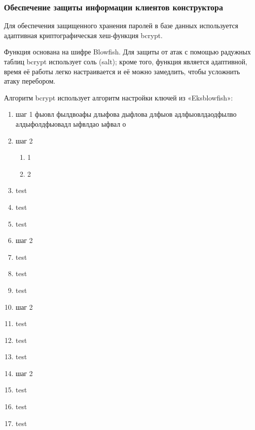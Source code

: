 
\subsubsection{Обеспечение защиты информации клиентов конструктора}

Для обеспечения защищенного хранения паролей в базе данных используется
адаптивная криптографическая хеш-функция bcrypt.

Функция основана на шифре Blowfish.
Для защиты от атак с помощью радужных таблиц bcrypt использует соль (salt);
кроме того, функция является адаптивной,
время её работы легко настраивается и её можно замедлить, чтобы усложнить атаку перебором.


Алгоритм bcrypt использует алгоритм настройки ключей из «Eksblowfish»:

\begin{enumerate}
	\item шаг 1 фыовл фылдвоафы длыфова дыфлова длфыов адлфыовлдаодфылво алдыфолдфыовадл ыфвлдао ыфвал о
	\item шаг 2
	      \begin{enumerate}
		      \item 1
		      \item 2
	      \end{enumerate}
	\item test
	\item test
	\item test
	\item шаг 2
	\item test
	\item test
	\item test
	\item шаг 2
	\item test
	\item test
	\item test
	\item шаг 2
	\item test
	\item test
	\item test
\end{enumerate}



